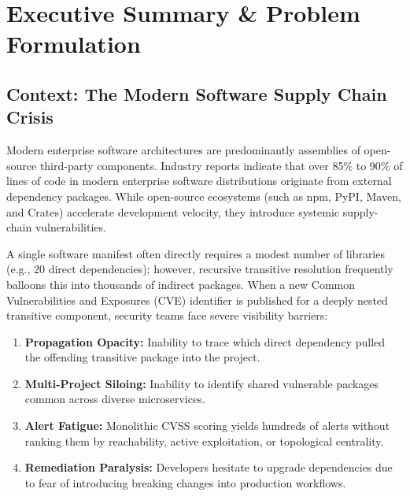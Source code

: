 \documentclass[12pt,a4paper,oneside]{report}
\begin{document}
\chapter{Executive Summary \& Problem Formulation}

\section{Context: The Modern Software Supply Chain Crisis}
Modern enterprise software architectures are predominantly assemblies of open-source third-party components. Industry reports indicate that over 85\% to 90\% of lines of code in modern enterprise software distributions originate from external dependency packages. While open-source ecosystems (such as npm, PyPI, Maven, and Crates) accelerate development velocity, they introduce systemic supply-chain vulnerabilities. 

A single software manifest often directly requires a modest number of libraries (e.g., 20 direct dependencies); however, recursive transitive resolution frequently balloons this into thousands of indirect packages. When a new Common Vulnerabilities and Exposures (CVE) identifier is published for a deeply nested transitive component, security teams face severe visibility barriers:
\begin{enumerate}[noitemsep]
    \item \textbf{Propagation Opacity:} Inability to trace which direct dependency pulled the offending transitive package into the project.
    \item \textbf{Multi-Project Siloing:} Inability to identify shared vulnerable packages common across diverse microservices.
    \item \textbf{Alert Fatigue:} Monolithic CVSS scoring yields hundreds of alerts without ranking them by reachability, active exploitation, or topological centrality.
    \item \textbf{Remediation Paralysis:} Developers hesitate to upgrade dependencies due to fear of introducing breaking changes into production workflows.
\end{enumerate}
\end{document}
